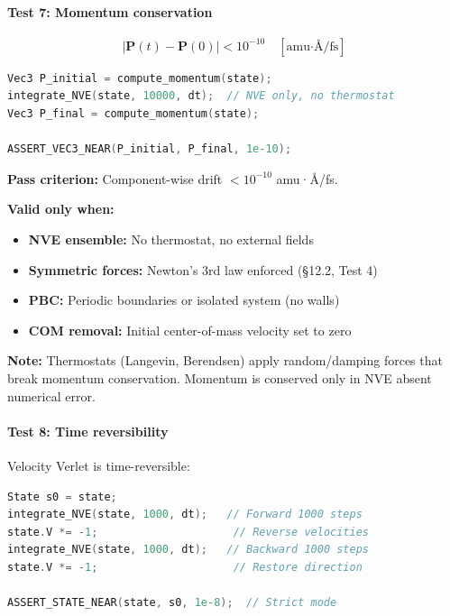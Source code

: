 \documentclass[11pt]{article}
\begin{document}
\paragraph{Test 7: Momentum conservation}

\begin{equation}
|\mathbf{P}(t) - \mathbf{P}(0)| < 10^{-10} \quad [\text{amu·Å/fs}]
\end{equation}

\begin{lstlisting}[language=C++]
Vec3 P_initial = compute_momentum(state);
integrate_NVE(state, 10000, dt);  // NVE only, no thermostat
Vec3 P_final = compute_momentum(state);

ASSERT_VEC3_NEAR(P_initial, P_final, 1e-10);
\end{lstlisting}

\textbf{Pass criterion:} Component-wise drift $< 10^{-10}$ amu·Å/fs.

\textbf{Valid only when:}
\begin{itemize}
\item \textbf{NVE ensemble:} No thermostat, no external fields
\item \textbf{Symmetric forces:} Newton's 3rd law enforced (§12.2, Test 4)
\item \textbf{PBC:} Periodic boundaries or isolated system (no walls)
\item \textbf{COM removal:} Initial center-of-mass velocity set to zero
\end{itemize}

\textbf{Note:} Thermostats (Langevin, Berendsen) apply random/damping forces that break momentum conservation. Momentum is conserved only in NVE absent numerical error.

\paragraph{Test 8: Time reversibility}

Velocity Verlet is time-reversible:

\begin{lstlisting}[language=C++]
State s0 = state;
integrate_NVE(state, 1000, dt);   // Forward 1000 steps
state.V *= -1;                     // Reverse velocities
integrate_NVE(state, 1000, dt);   // Backward 1000 steps
state.V *= -1;                     // Restore direction

ASSERT_STATE_NEAR(state, s0, 1e-8);  // Strict mode
\end{lstlisting}
\end{document}
